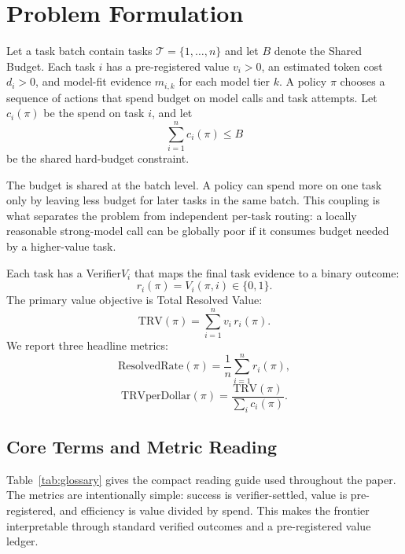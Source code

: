 \documentclass{article}
\newcommand{\sharedbudget}{Shared Budget\xspace}
\newcommand{\verifier}{Verifier\xspace}
\begin{document}
\section{Problem Formulation}
\label{sec:formulation}
Let a task batch contain tasks $\mathcal{T}=\{1,\ldots,n\}$ and let $B$ denote the \sharedbudget. Each task $i$ has a pre-registered value $v_i>0$, an estimated token cost $d_i>0$, and model-fit evidence $m_{i,k}$ for each model tier $k$. A policy $\pi$ chooses a sequence of actions that spend budget on model calls and task attempts. Let $c_i(\pi)$ be the spend on task $i$, and let
\[
    \sum_{i=1}^{n} c_i(\pi) \le B
\]
be the shared hard-budget constraint.

The budget is shared at the batch level. A policy can spend more on one task only by leaving less budget for later tasks in the same batch. This coupling is what separates the problem from independent per-task routing: a locally reasonable strong-model call can be globally poor if it consumes budget needed by a higher-value task.

Each task has a \verifier $V_i$ that maps the final task evidence to a binary outcome:
\[
    r_i(\pi)=V_i(\pi,i)\in\{0,1\}.
\]
The primary value objective is Total Resolved Value:
\[
    \mathrm{TRV}(\pi)=\sum_{i=1}^{n} v_i\,r_i(\pi).
\]
We report three headline metrics:
\[
    \mathrm{ResolvedRate}(\pi)=\frac{1}{n}\sum_{i=1}^{n}r_i(\pi),
\]
\[
    \mathrm{TRVperDollar}(\pi)=
    \frac{\mathrm{TRV}(\pi)}{\sum_i c_i(\pi)}.
\]

\subsection{Core Terms and Metric Reading}
Table~\ref{tab:glossary} gives the compact reading guide used throughout the paper. The metrics are intentionally simple: success is verifier-settled, value is pre-registered, and efficiency is value divided by spend. This makes the frontier interpretable through standard verified outcomes and a pre-registered value ledger.
\end{document}
